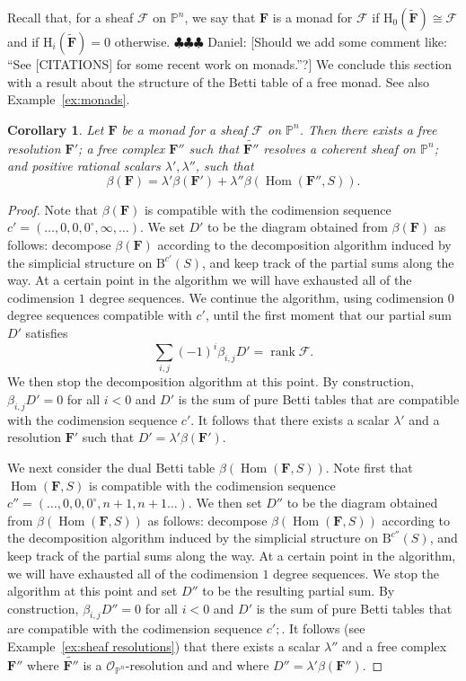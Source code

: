 \documentclass[12pt]{amsart}
\newtheorem{cor}[lemma]{Corollary}
\theoremstyle{definition}
\theoremstyle{remark}
\newcommand{\Hom}{\operatorname{Hom}} %
\newcommand{\rank}{\operatorname{rank}}
\newcommand{\PP}{\mathbb{P}}
\newcommand{\HH}{\mathrm{H}}
\newcommand{\bb}{c}
\newcommand{\cO}{\mathcal{O}}
\newcommand{\cF}{\mathcal{F}}
\newcommand{\FF}{\mathbf{F}}
\newcommand{\defi}[1]{\textsf{#1}} %
\newcommand{\zp}{\circ}
\newcommand{\BBQ}{\mathrm{B}}
\newcommand{\daniel}[1]{{\color{green} \sf $\clubsuit\clubsuit\clubsuit$ Daniel: [#1]}}
\begin{document}
Recall that, for a sheaf $\cF$ on $\PP^n$, we say that $\FF$ is a \defi{monad} for $\cF$ if $\HH_0(\widetilde{\FF})\cong \cF$ and if $\HH_i(\widetilde{\FF})=0$ otherwise.   \daniel{Should we add some comment like: ``See [CITATIONS] for some recent work on monads.''?}  We conclude this section with a result about the structure of the Betti table of a free monad.  See also Example~\ref{ex:monads}.
\begin{cor}\label{cor:monads}
Let $\FF$ be a monad for a sheaf $\cF$ on $\PP^n$.  Then there exists a free resolution $\FF'$; a free complex $\FF''$ such that $\widetilde{\FF''}$ resolves a coherent sheaf on $\PP^n$; and positive rational scalars $\lambda', \lambda''$, such that
\[
\beta(\FF)=\lambda'\beta(\FF')+\lambda''\beta(\Hom(\FF'',S)).
\]
\end{cor}
\begin{proof}
Note that $\beta(\FF)$ is compatible with the codimension sequence $\bb'=(\dots,0,0,0^{\zp},\infty,\dots)$. We set $D'$ to be the diagram obtained from $\beta(\FF)$ as follows: decompose $\beta(\FF)$ according to the decomposition algorithm induced by the simplicial structure on $\BBQ^{\bb'}(S)$, and keep track of the partial sums along the way.  At a certain point in the algorithm we will have exhausted all of the codimension $1$ degree sequences.  We continue the algorithm, using codimension $0$ degree sequences compatible with $\bb'$, until the first moment that our partial sum $D'$ satisfies
\[
\sum_{i,j} (-1)^i\beta_{i,j}D'=\rank \cF.
\]
We then stop the decomposition algorithm at this point.  By construction, $\beta_{i,j}D'=0$ for all $i<0$ and $D'$ is the sum of pure Betti tables that are compatible with the codimension sequence $\bb'$.  It follows that there exists a scalar $\lambda'$ and a resolution $\FF'$ such that $D'=\lambda'\beta(\FF')$.

We next consider the dual Betti table $\beta(\Hom(\FF,S))$.  Note first that $\Hom(\FF,S)$ is compatible with the codimension sequence $\bb''=(\dots,0,0,0^{\zp},n+1,n+1\dots)$.  We then set $D''$ to be the diagram obtained from $\beta(\Hom(\FF,S))$ as follows: decompose $\beta(\Hom(\FF,S))$ according to the decomposition algorithm induced by the simplicial structure on $\BBQ^{\bb''}(S)$, and keep track of the partial sums along the way.  At a certain point in the algorithm, we will have exhausted all of the codimension $1$ degree sequences.  We stop the algorithm at this point and set $D''$ to be the resulting partial sum.
By construction, $\beta_{i,j}D''=0$ for all $i<0$ and $D'$ is the sum of pure Betti tables that are compatible with the codimension sequence $\bb';$.
It follows (see Example~\ref{ex:sheaf resolutions}) that there exists a scalar $\lambda''$ and a free complex $\FF''$ where $\widetilde{\FF''}$ is a $\cO_{\PP^n}$-resolution and and where $D''=\lambda'\beta(\FF'')$.


\end{proof}
\end{document}
